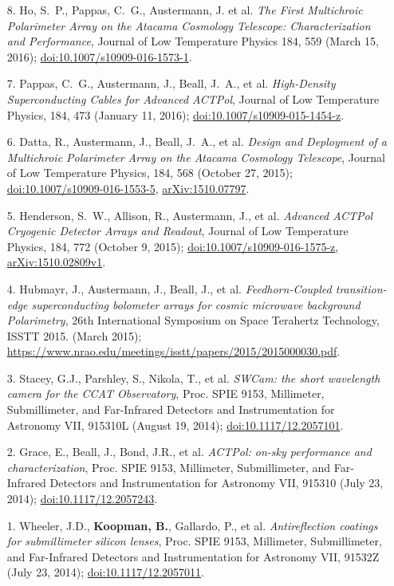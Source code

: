 \documentclass[margin,line]{res}
\begin{document}
\begin{resume}
\begin{enumerate}
\item[{8.}] Ho, S.~P., Pappas, C.~G., Austermann, J. et al. \textit{The First
    Multichroic Polarimeter Array on the Atacama Cosmology Telescope:
    Characterization and Performance}, Journal of Low Temperature Physics 184, 559 (March 15, 2016);
    \href{http://dx.doi.org/10.1007/s10909-016-1573-1}{doi:10.1007/s10909-016-1573-1}.
\item[{7.}] Pappas, C.~G., Austermann, J., Beall, J.~A., et al.
    \textit{High-Density Superconducting Cables for Advanced ACTPol}, Journal of Low
    Temperature Physics, 184, 473 (January 11, 2016);
    \href{http://dx.doi.org/10.1007/s10909-015-1454-z}{doi:10.1007/s10909-015-1454-z}.
\item[{6.}] Datta, R., Austermann, J., Beall, J.~A., et al. \textit{Design and
    Deployment of a Multichroic Polarimeter Array on the Atacama Cosmology
    Telescope}, Journal of Low Temperature Physics, 184, 568 (October 27, 2015);
    \href{http://dx.doi.org/10.1007/s10909-016-1553-5}{doi:10.1007/s10909-016-1553-5},
    \href{http://arxiv.org/abs/1510.07797}{arXiv:1510.07797}.
\item[{5.}] Henderson, S.~W., Allison, R., Austermann, J., et al.
    \textit{Advanced ACTPol Cryogenic Detector Arrays and Readout}, Journal of Low
    Temperature Physics, 184, 772 (October 9, 2015);
    \href{http://dx.doi.org/10.1007/s10909-016-1575-z}{doi:10.1007/s10909-016-1575-z},
    \href{http://arxiv.org/abs/1510.02809v1}{arXiv:1510.02809v1}.
\item[{4.}] Hubmayr, J., Austermann, J., Beall, J., et al. \textit{Feedhorn-Coupled
    transition-edge superconducting bolometer arrays for cosmic microwave
    background Polarimetry}, 26th International Symposium on Space Terahertz
    Technology, ISSTT 2015. (March 2015);\\
    \href{https://www.nrao.edu/meetings/isstt/papers/2015/2015000030.pdf}{https://www.nrao.edu/meetings/isstt/papers/2015/2015000030.pdf}.
\item[{3.}] Stacey, G.J., Parshley, S., Nikola, T., et al.
    \textit{SWCam: the short wavelength camera for the CCAT Observatory},
    Proc. SPIE 9153, Millimeter, Submillimeter, and Far-Infrared Detectors and Instrumentation for Astronomy VII, 
    915310L (August 19, 2014); \href{http://dx.doi.org/10.1117/12.2057101}{doi:10.1117/12.2057101}.
\item[{2.}] Grace, E., Beall, J., Bond, J.R., et al.
    \textit{ACTPol: on-sky performance and characterization},
    Proc. SPIE 9153, Millimeter, Submillimeter, and Far-Infrared Detectors and Instrumentation for Astronomy VII, 
    915310 (July 23, 2014); \href{http://dx.doi.org/10.1117/12.2057243}{doi:10.1117/12.2057243}.
\item[{1.}] Wheeler, J.D., \textbf{Koopman, B.}, Gallardo, P., et al.
    \textit{Antireflection coatings for submillimeter silicon lenses},
    Proc. SPIE 9153, Millimeter, Submillimeter, and Far-Infrared Detectors and Instrumentation for Astronomy VII, 
    91532Z (July 23, 2014); \href{http://dx.doi.org/10.1117/12.2057011}{doi:10.1117/12.2057011}.
\end{enumerate}


\end{resume}
\end{document}

